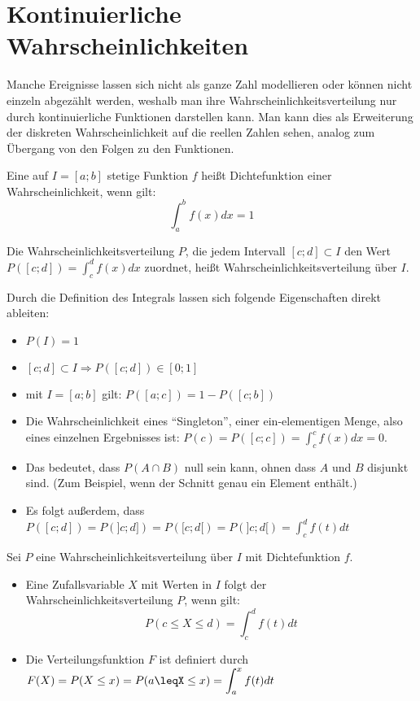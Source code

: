 \documentclass[../MAIN/main.tex]{subfiles}
\begin{document}
\section{Kontinuierliche Wahrscheinlichkeiten}
Manche Ereignisse lassen sich nicht als ganze Zahl modellieren oder können nicht einzeln abgezählt werden, weshalb man ihre Wahrscheinlichkeitsverteilung nur durch kontinuierliche Funktionen darstellen kann. Man kann dies als Erweiterung der diskreten Wahrscheinlichkeit auf die reellen Zahlen sehen, analog zum Übergang von den Folgen zu den Funktionen.
\begin{Definition}[- Dichtefunktion]
  Eine auf $I = [a;b]$ stetige Funktion $f$ heißt Dichtefunktion einer Wahrscheinlichkeit, wenn gilt:
  $$\int_{a}^{b} f(x)dx =1$$
\end{Definition}
\begin{Definition}
  Die Wahrscheinlichkeitsverteilung $P$, die jedem Intervall $[c;d] \subset I$ den Wert $P([c;d]) = \displaystyle \int_c^d f(x)dx$ zuordnet, heißt Wahrscheinlichkeitsverteilung über $I$.
\end{Definition}
\begin{Bemerkung}
  Durch die Definition des Integrals lassen sich folgende Eigenschaften direkt ableiten:
  \begin{itemize}
    \item $P(I)=1$
    \item $[c;d] \subset I \Rightarrow P([c;d])\in [0;1]$
    \item mit $I = [a;b]$ gilt: $P([a;c]) = 1- P([c;b])$
    \item Die Wahrscheinlichkeit eines ``Singleton'', einer ein-elementigen Menge, also eines einzelnen Ergebnisses ist:
    $P({c})=P([c;c])=\displaystyle\int_c^c f(x)dx =0$.
    \item Das bedeutet, dass $P(A \cap B)$ null sein kann, ohnen dass $A$ und $B$ disjunkt sind. (Zum Beispiel, wenn der Schnitt genau ein Element enthält.)
    \item Es folgt außerdem, dass $P([c;d])=P(]c;d])=P([c;d[)=P(]c;d[)=\displaystyle\int_c^d f(t)dt$
  \end{itemize}
\end{Bemerkung}
\begin{Definition}
  Sei $P$ eine Wahrscheinlichkeitsverteilung über $I$ mit Dichtefunktion $f$.\\
  \begin{itemize}
    \item Eine Zufallsvariable $X$ mit Werten in $I$ folgt der Wahrscheinlichkeitsverteilung $P$, wenn gilt: $$P(c\leq X \leq d)=\displaystyle \int_c^d f(t)dt$$
    \item Die Verteilungsfunktion $F$ ist definiert durch $F(X)=P(X\leq x)=P(a\leqX\leq x)=\displaystyle\int_a^x f(t)dt$
  \end{itemize}
\end{Definition}
\end{document}
